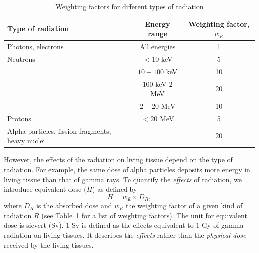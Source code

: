 \documentclass[nofootinbib,preprint,aps]{revtex4-1}
\begin{document}
        \begin{table}
            \centering
            \caption{Weighting factors for different types of radiation \cite{icrp74}}
            \begin{ruledtabular}
                \begin{tabular}{l c c}
                Type of radiation & Energy range & Weighting factor, $w_R$\\
                \hline
                Photons, electrons & All energies & 1\\
                Neutrons & $<10$ keV & 5 \\
                         & $10-100$ keV & 10 \\
                         & $100$ keV-$2$ MeV & 20 \\
                         & $2-20$ MeV & 10 \\
                Protons & $<20$ MeV & 5 \\
                Alpha particles, fission fragments, heavy nuclei & & $20$\\
            \end{tabular}
            \label{tab:eq}
            \end{ruledtabular}
        \end{table}
        However, the effects of the radiation on living tissue depend on the type of radiation.
        For example, the same dose of alpha particles deposits more energy in living tissue than that of gamma rays.
        To quantify the {\it effects} of radiation, we introduce equivalent
        dose ($H$) as defined by 
        \begin{equation}
        H=w_R \times D_R,
        \end{equation}
        where $D_R$ is the absorbed dose and $w_R$ the weighting factor of a given kind of radiation $R$
        (see Table~\ref{tab:eq} for a list of weighting factors). The unit for equivalent dose is sievert (Sv).
        $1$ Sv is defined as the effects equivalent to $1$ Gy of gamma radiation on living tissues. It describes
        the {\it effects} rather than the {\it physical dose} received by the living tissues.
\end{document}
